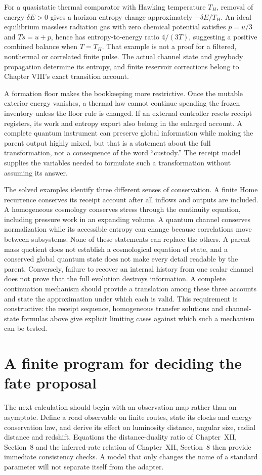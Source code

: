 For a quasistatic thermal comparator with Hawking temperature $T_H$, removal of energy $\delta E>0$ gives a horizon entropy change approximately $-\delta E/T_H$. An ideal equilibrium massless radiation gas with zero chemical potential satisfies $p=u/3$ and $Ts=u+p$, hence has entropy-to-energy ratio $4/(3T)$, suggesting a positive combined balance when $T=T_H$. That example is not a proof for a filtered, nonthermal or correlated finite pulse. The actual channel state and greybody propagation determine its entropy, and finite reservoir corrections belong to Chapter VIII's exact transition account.

A formation floor makes the bookkeeping more restrictive. Once the mutable exterior energy vanishes, a thermal law cannot continue spending the frozen inventory unless the floor rule is changed. If an external controller resets receipt registers, its work and entropy export also belong in the enlarged account. A complete quantum instrument can preserve global information while making the parent output highly mixed, but that is a statement about the full transformation, not a consequence of the word ``custody.'' The receipt model supplies the variables needed to formulate such a transformation without assuming its answer.

The solved examples identify three different senses of conservation. A finite Home recurrence conserves its receipt account after all inflows and outputs are included. A homogeneous cosmology conserves stress through the continuity equation, including pressure work in an expanding volume. A quantum channel conserves normalization while its accessible entropy can change because correlations move between subsystems. None of these statements can replace the others. A parent mass quotient does not establish a cosmological equation of state, and a conserved global quantum state does not make every detail readable by the parent. Conversely, failure to recover an internal history from one scalar channel does not prove that the full evolution destroys information. A complete continuation mechanism should provide a translation among these three accounts and state the approximation under which each is valid. This requirement is constructive: the receipt sequence, homogeneous transfer solutions and channel-state formulas above give explicit limiting cases against which such a mechanism can be tested.

\section{A finite program for deciding the fate proposal}
The next calculation should begin with an observation map rather than an asymptote. Define a road observable on finite routes, state its clocks and energy conservation law, and derive its effect on luminosity distance, angular size, radial distance and redshift. Equations the distance-duality ratio of Chapter~XII, Section~8 and the inferred-rate relation of Chapter~XII, Section~8 then provide immediate consistency checks. A model that only changes the name of a standard parameter will not separate itself from the adapter.

